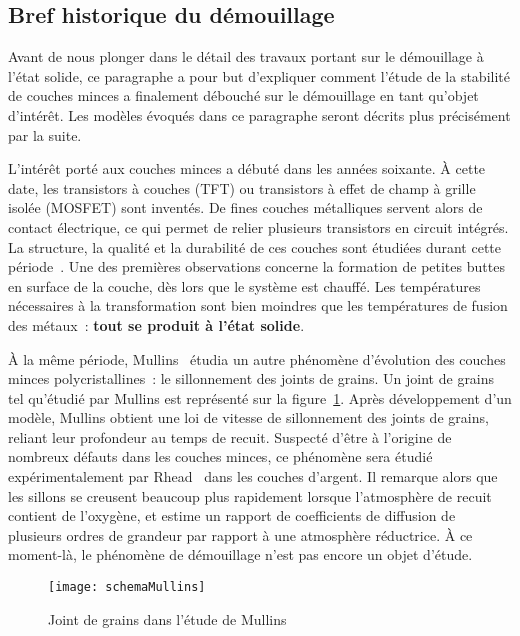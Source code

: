 	\subsection{Bref historique du démouillage}
\label{sHistoire}
Avant de nous plonger dans le détail des travaux portant sur le démouillage à l’état solide, ce paragraphe a pour but d'expliquer comment l'étude de la stabilité de couches minces a finalement débouché sur le démouillage en tant qu'objet d'intérêt. Les modèles évoqués dans ce paragraphe seront décrits plus précisément par la suite.\par 
L'intérêt porté aux couches minces a débuté dans les années soixante. À cette date, les transistors à couches (TFT) ou transistors à effet de champ à grille isolée (MOSFET) sont inventés. De fines couches métalliques servent alors de contact électrique, ce qui permet de relier plusieurs transistors en circuit intégrés. La structure, la qualité et la durabilité de ces couches sont étudiées durant cette période~\cite{pennebaker1969hillock,dheurle1968structure,caswell1963low}. Une des premières observations concerne la formation de petites buttes en surface de la couche, dès lors que le système est chauffé. Les températures nécessaires à la transformation sont bien moindres que les températures de fusion des métaux~:
\textbf{tout se produit à l'état solide}.\par 
À la même période, Mullins~\cite{mullins1957theory} étudia un autre phénomène d'évolution des couches minces polycristallines~: le sillonnement des joints de grains. Un joint de grains tel qu'étudié par Mullins est représenté sur la figure~\ref{schemaMullins}. Après développement d'un modèle, Mullins obtient une loi de vitesse de sillonnement des joints de grains, reliant leur profondeur au temps de recuit. Suspecté d'être à l'origine de nombreux défauts dans les couches minces, ce phénomène sera étudié expérimentalement par Rhead~\cite{rhead1963surface,rhead1965surface} dans les couches d'argent. Il remarque alors que les sillons se creusent beaucoup plus rapidement lorsque l'atmosphère de recuit contient de l'oxygène, et estime un rapport de coefficients de diffusion de plusieurs ordres de grandeur par rapport à une atmosphère réductrice. À ce moment-là, le phénomène de \og démouillage \fg{} n'est pas encore un objet d'étude.\par 
\begin{figure}[!htb]
	\centering
	\texttt{[image: schemaMullins]}
	\caption{Joint de grains dans l'étude de Mullins}
	\label{schemaMullins}
\end{figure}
